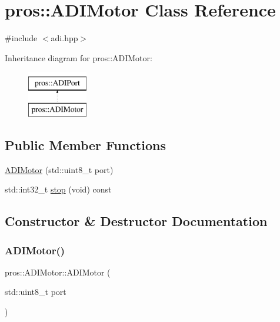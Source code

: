 \hypertarget{classpros_1_1ADIMotor}{}\section{pros\+:\+:A\+D\+I\+Motor Class Reference}
\label{classpros_1_1ADIMotor}


{\ttfamily \#include $<$adi.\+hpp$>$}

Inheritance diagram for pros\+:\+:A\+D\+I\+Motor\+:\begin{figure}[H]
\begin{center}
\leavevmode
\includegraphics[height=2.000000cm]{classpros_1_1ADIMotor}
\end{center}
\end{figure}
\subsection*{Public Member Functions}
\begin{DoxyCompactItemize}
\item 
\hyperlink{classpros_1_1ADIMotor_afd2da0e8c53a8bc0c999d5232242069a}{A\+D\+I\+Motor} (std\+::uint8\+\_\+t port)
\item 
std\+::int32\+\_\+t \hyperlink{classpros_1_1ADIMotor_ad8e9be8dfbc022e893a4d15996fe3bcd}{stop} (void) const
\end{DoxyCompactItemize}


\subsection{Constructor \& Destructor Documentation}
\mbox{\label{classpros_1_1ADIMotor_afd2da0e8c53a8bc0c999d5232242069a}} 
\subsubsection{\texorpdfstring{A\+D\+I\+Motor()}{ADIMotor()}}
{\footnotesize\ttfamily pros\+::\+A\+D\+I\+Motor\+::\+A\+D\+I\+Motor (\begin{DoxyParamCaption}\item[{std\+::uint8\+\_\+t}]{port }\end{DoxyParamCaption})}

